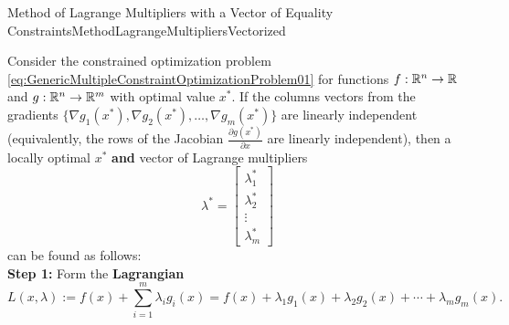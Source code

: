 \begin{methodColor}{Method of Lagrange Multipliers with a Vector of Equality Constraints}{MethodLagrangeMultipliersVectorized} 

Consider the constrained optimization problem \eqref{eq:GenericMultipleConstraintOptimizationProblem01} for functions $f:\mathbb R^n \to \mathbb R$ and $g:\mathbb R^n \to \mathbb R^m$ with optimal value $x^\ast$. If the columns vectors from the  gradients $\{ \nabla g_1(x^\ast),  \nabla g_2(x^\ast), \ldots,  \nabla g_m(x^\ast)\}$ are linearly independent (equivalently, the rows of the Jacobian $\frac{ \partial g(x^\ast)}{\partial x} $ are linearly independent), then a locally optimal $x^\ast$ \textbf{and} vector of Lagrange multipliers $$\lambda^\ast = \left[\begin{array}{c}
\lambda^\ast_1 \\
\lambda^\ast_2 \\
\vdots \\
\lambda^\ast_m
\end{array} \right]$$
can be found as follows: \\

\textbf{Step 1:} Form the \textbf{Lagrangian}
\begin{equation}
    L(x, \lambda):= f(x) + \sum_{i=1}^m \lambda_i g_i(x) = f(x) + \lambda_1 g_1(x) + \lambda_2 g_2(x) + \cdots + \lambda_m g_m(x).
\end{equation}

\bigskip


\end{methodColor}

